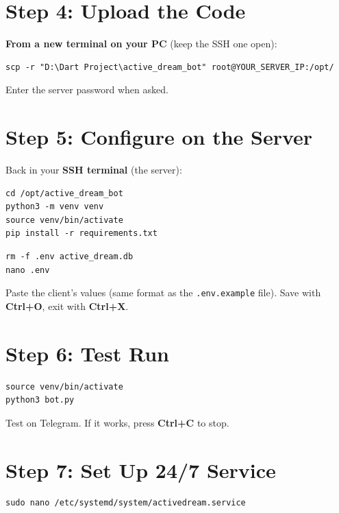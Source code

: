 \section{Step 4: Upload the Code}

\textbf{From a new terminal on your PC} (keep the SSH one open):

\begin{lstlisting}[style=termstyle]
scp -r "D:\Dart Project\active_dream_bot" root@YOUR_SERVER_IP:/opt/
\end{lstlisting}

Enter the server password when asked.

\section{Step 5: Configure on the Server}

Back in your \textbf{SSH terminal} (the server):

\begin{lstlisting}[style=termstyle, title={Set up Python environment}]
cd /opt/active_dream_bot
python3 -m venv venv
source venv/bin/activate
pip install -r requirements.txt
\end{lstlisting}

\begin{lstlisting}[style=termstyle, title={Remove test data and create production config}]
rm -f .env active_dream.db
nano .env
\end{lstlisting}

Paste the client's values (same format as the \texttt{.env.example} file). Save with \textbf{Ctrl+O}, exit with \textbf{Ctrl+X}.

\section{Step 6: Test Run}

\begin{lstlisting}[style=termstyle]
source venv/bin/activate
python3 bot.py
\end{lstlisting}

Test on Telegram. If it works, press \textbf{Ctrl+C} to stop.

\section{Step 7: Set Up 24/7 Service}

\begin{lstlisting}[style=termstyle, title={Create service file}]
sudo nano /etc/systemd/system/activedream.service
\end{lstlisting}


